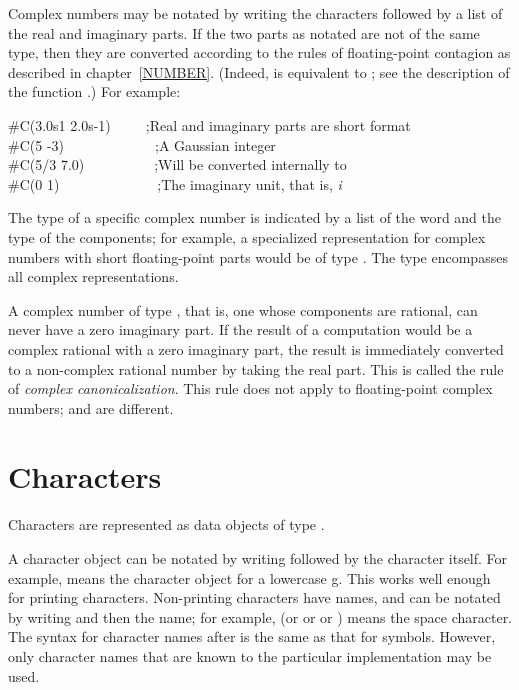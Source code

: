 Complex numbers may be notated by writing the characters 
followed by a list of the real and imaginary parts.
If the two parts as notated are not of the same type, then
they are converted according to the rules of floating-point contagion
as described in chapter~\ref{NUMBER}.
(Indeed,  is equivalent to ;
see the description of the function .)
For example:
\begin{lisp}
\#C(3.0s1 2.0s-1)~~~~~;\textrm{Real and imaginary parts are short format}\\
\#C(5 -3)~~~~~~~~~~~~~;\textrm{A Gaussian integer} \\
\#C(5/3 7.0)~~~~~~~~~~;\textrm{Will be converted internally to } \\
\#C(0 1)~~~~~~~~~~~~~~;\textrm{The imaginary unit, that is, \emph{i}}
\end{lisp}

The type of a specific complex number is indicated by a list
of the word  and the type of the components; for example,
a specialized representation for complex numbers with short floating-point
parts would be of type .  The type 
encompasses all complex representations.

A complex number of type , that is, one whose
components are rational, can never have a zero imaginary part.
If the result of a computation would be a complex rational
with a zero imaginary part, the result is immediately
converted to a non-complex rational number by taking the
real part.  This is called the rule of \emph{complex canonicalization}.
This rule does not apply to floating-point complex numbers;
 and  are different.

\goodbreak

\section{Characters}

Characters are represented as data objects of type .

A character object can be notated by writing \cd{\#{\Xbackslash}} followed
by the character itself.  For example,  means the character
object for a lowercase g.  This works well enough for printing
characters.  Non-printing characters have names, and can be notated
by writing \cd{\#{\Xbackslash}} and then the name; for example, 
(or  or  or )
means the space character.  The syntax for character names after \cd{\#{\Xbackslash}}
is the same as that for symbols.  However, only character names
that are known to the particular implementation may be used.

